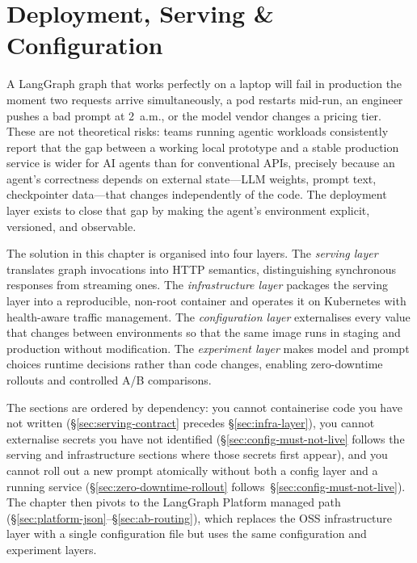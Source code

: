 
\chapter{Deployment, Serving \& Configuration}
\label{chap:deployment}

A LangGraph graph that works perfectly on a laptop will fail in production
the moment two requests arrive simultaneously, a pod restarts mid-run, an
engineer pushes a bad prompt at 2~a.m., or the model vendor changes a
pricing tier. These are not theoretical risks: teams running agentic
workloads consistently report that the gap between a working local
prototype and a stable production service is wider for AI agents than for
conventional APIs, precisely because an agent's correctness depends on
external state---LLM weights, prompt text, checkpointer data---that changes
independently of the code. The deployment layer exists to close that gap by
making the agent's environment explicit, versioned, and observable.

The solution in this chapter is organised into four layers. The
\emph{serving layer} translates graph invocations into HTTP semantics,
distinguishing synchronous responses from streaming ones. The
\emph{infrastructure layer} packages the serving layer into a reproducible,
non-root container and operates it on Kubernetes with health-aware traffic
management. The \emph{configuration layer} externalises every value that
changes between environments so that the same image runs in staging and
production without modification. The \emph{experiment layer} makes model
and prompt choices runtime decisions rather than code changes, enabling
zero-downtime rollouts and controlled A/B comparisons.

The sections are ordered by dependency: you cannot containerise code you
have not written (\S\ref{sec:serving-contract} precedes
\S\ref{sec:infra-layer}), you cannot externalise secrets you have not
identified (\S\ref{sec:config-must-not-live} follows the serving and
infrastructure sections where those secrets first appear), and you cannot
roll out a new prompt atomically without both a config layer and a running
service (\S\ref{sec:zero-downtime-rollout} follows~\S\ref{sec:config-must-not-live}).
The chapter then pivots to the LangGraph Platform managed path
(\S\ref{sec:platform-json}--\S\ref{sec:ab-routing}), which replaces the OSS
infrastructure layer with a single configuration file but uses the same
configuration and experiment layers.

